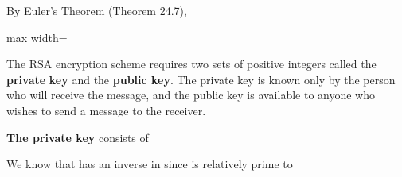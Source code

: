 \documentclass[11pt,oneside]{article}
\begin{document}
\begin{BookBody}
\noindent By Euler’s Theorem (Theorem 24.7),

\begin{center}\begin{adjustbox}{max width=\linewidth}\end{adjustbox}\end{center} \BookEnd{\blacklozenge}

\noindent The RSA encryption scheme requires two sets of positive integers called the\textbf{ private} \textbf{key} and the\textbf{ public key}. The private key is known only by the person who will receive the message, and the public key is available to anyone who wishes to send a message to the receiver.

\noindent \textbf{The private key} consists of




We know that  has an inverse in  since  is relatively prime to 

\end{BookBody}

\BookNarrativetrue
\end{document}
